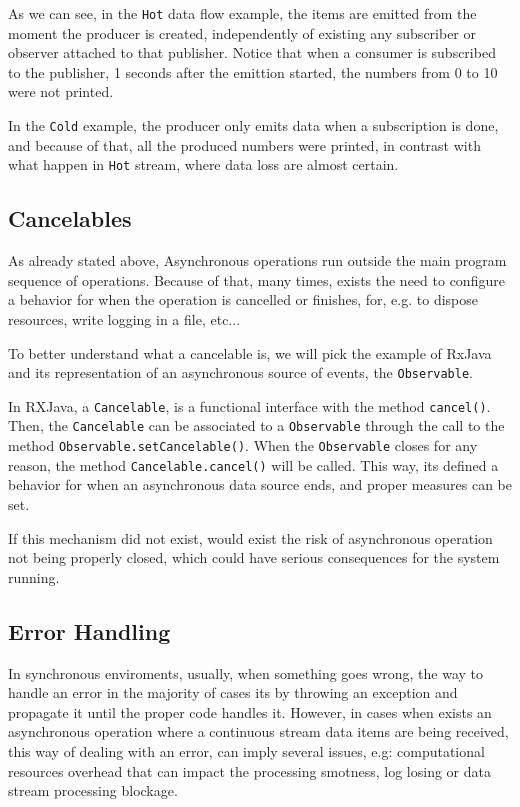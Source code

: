 	
	As we can see, in the \texttt{Hot} data flow example, the items are emitted from the moment the producer is created, independently of existing any subscriber or observer attached to that publisher. Notice that when a consumer is subscribed to the publisher, 1 seconds after the emittion started, the numbers from 0 to 10 were not printed.
	
	In the \texttt{Cold} example, the producer only emits data when a subscription is done, and because of that, all the produced numbers were printed, in contrast with what happen in \texttt{Hot} stream, where data loss are almost certain. 

	\subsection{Cancelables} 
	As already stated above, Asynchronous operations run outside the main program sequence of operations. 
	Because of that, many times, exists the need to configure a behavior for when the operation is cancelled or finishes, for, e.g. to dispose resources, write logging in a file, etc...

	To better understand what a cancelable is, we will pick the example of RxJava and its representation of an asynchronous source of events, the \texttt{Observable}. 
	
	In RXJava, a \texttt{Cancelable}, is a functional interface with the method \texttt{cancel()}. Then, the \texttt{Cancelable} can be associated to a \texttt{Observable} through the call to the method \texttt{Observable.setCancelable()}. 
	When the \texttt{Observable} closes for any reason, the method \texttt{Cancelable.cancel()} will be called. This way, its defined a behavior for when an asynchronous data source ends, and proper measures can be set. 
	
	If this mechanism did not exist, would exist the risk of asynchronous operation not being properly closed, which could have serious consequences for the system running.

	 

	 \subsection{Error Handling}  
	 In synchronous enviroments, usually, when something goes wrong, the way to handle an error in the majority of cases its by throwing an exception and propagate it until the proper code handles it. 
	 However, in cases when exists an asynchronous operation where a continuous stream data items are being received, this way of dealing with an error, can imply several issues, e.g: computational resources overhead that can impact the processing smotness, log losing or data stream processing blockage. 
	 
